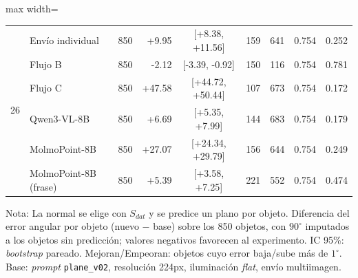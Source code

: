 \begin{table}[htbp]
\begin{lrbox}{\tablebox}
\begin{adjustbox}{max width=\textwidth}
\begin{tabular}{llrrcrrrr}
\midrule
\multirow{6}{*}{26} & Envío individual & 850 & +9.95 & [+8.38, +11.56] & 159 & 641 & 0.754 & 0.252 \\
 & Flujo B & 850 & -2.12 & [-3.39, -0.92] & 150 & 116 & 0.754 & 0.781 \\
 & Flujo C & 850 & +47.58 & [+44.72, +50.44] & 107 & 673 & 0.754 & 0.172 \\
 & Qwen3-VL-8B & 850 & +6.69 & [+5.35, +7.99] & 144 & 683 & 0.754 & 0.179 \\
 & MolmoPoint-8B & 850 & +27.07 & [+24.34, +29.79] & 156 & 644 & 0.754 & 0.249 \\
 & MolmoPoint-8B (frase) & 850 & +5.39 & [+3.58, +7.25] & 221 & 552 & 0.754 & 0.474 \\
\bottomrule
\end{tabular}
\end{adjustbox}
\end{lrbox}
\usebox{\tablebox}

\vspace{1.5ex}
\begin{minipage}{\wd\tablebox}
\footnotesize
Nota: La normal se elige con $S_{dat}$ y se predice un plano por objeto. Diferencia del error angular por objeto (nuevo $-$ base) sobre los 850 objetos, con $90^\circ$ imputados a los objetos sin predicción; valores negativos favorecen al experimento. IC 95\%: \textit{bootstrap} pareado. Mejoran/Empeoran: objetos cuyo error baja/sube más de $1^\circ$. Base: \textit{prompt} \texttt{plane\_v02}, resolución 224px, iluminación \textit{flat}, envío multiimagen.
\end{minipage}
\end{table}

\clearpage
